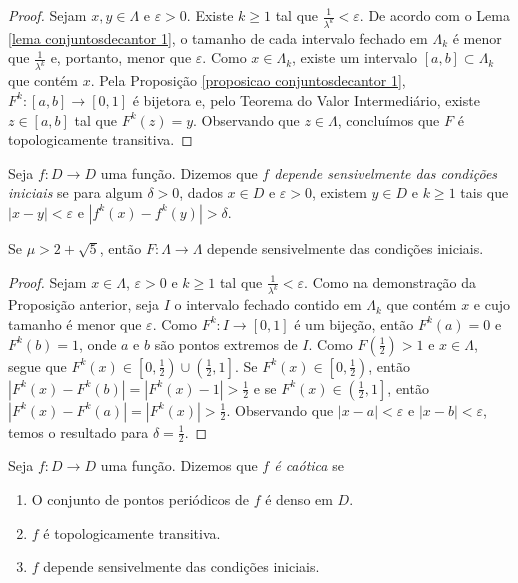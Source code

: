 \begin{proof}
Sejam $x, y \in \Lambda$ e $\varepsilon > 0$. Existe $k \geq 1$ tal que $\frac{1}{\lambda^k} < \varepsilon$. De acordo com o Lema \ref{lema conjuntosdecantor 1}, o tamanho de cada intervalo fechado em $\Lambda_k$ é menor que $\frac{1}{\lambda^k}$ e, portanto, menor que $\varepsilon$. Como $x \in \Lambda_ k$, existe um intervalo $[a, b] \subset \Lambda_ k$ que contém $x$. Pela Proposição \ref{proposicao conjuntosdecantor 1}, $F^k: [a, b] \to [0, 1]$ é bijetora e, pelo Teorema do Valor Intermediário, existe $z \in [a, b]$ tal que $F^k(z) = y$. Observando que $z \in \Lambda$, concluímos que $F$ é topologicamente transitiva.
\end{proof}

\begin{definition}
Seja $f: D \to D$ uma função. Dizemos que \textit{$f$ depende sensivelmente das condições iniciais} se para algum $\delta > 0$, dados $x \in D$ e $\varepsilon > 0$, existem $y \in D$ e $k \geq 1$ tais que $|x - y| < \varepsilon$ e $|f^k(x) - f^k(y)| > \delta$.
\end{definition}

\begin{proposition}
\label{proposicao caos 3}
Se $\mu > 2 + \sqrt{5}$, então $F: \Lambda \to \Lambda$ depende sensivelmente das condições iniciais.
\end{proposition}

\begin{proof}
Sejam $x \in \Lambda$, $\varepsilon > 0$ e $k \geq 1$ tal que $\frac{1}{\lambda^k} < \varepsilon$. Como na demonstração da Proposição anterior, seja $I$ o intervalo fechado contido em $\Lambda_k$ que contém $x$ e cujo tamanho é menor que $\varepsilon$. Como $F^k: I \to [0, 1]$ é um bijeção, então $F^k(a) = 0$ e  $F^k(b) = 1$, onde $a$ e $b$ são pontos extremos de $I$. Como $F(\frac{1}{2}) > 1$ e $x \in \Lambda$, segue que $F^{k}(x) \in \left[0, \frac{1}{2}\right) \cup \left(\frac{1}{2}, 1\right]$. Se $F^{k}(x) \in \left[0, \frac{1}{2}\right)$, então $|F^k(x) - F^k(b)| = |F^k(x) - 1| > \frac{1}{2}$ e se $F^{k}(x) \in \left(\frac{1}{2}, 1\right]$, então $|F^k(x) - F^k(a)| = |F^k(x)| > \frac{1}{2}$. Observando que $|x - a| < \varepsilon$ e  $|x - b| < \varepsilon$, temos o resultado para $\delta = \frac{1}{2}$. 
\end{proof}

\begin{definition}
Seja $f: D \to D$ uma função. Dizemos que \textit{$f$ é caótica} se
\begin{enumerate}
\item O conjunto de pontos periódicos de $f$ é denso em $D$.
\item $f$ é topologicamente transitiva.
\item $f$ depende sensivelmente das condições iniciais.
\end{enumerate}
\end{definition}

